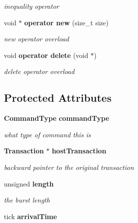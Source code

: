 \begin{CompactItemize}
\begin{CompactItemize}
\begin{CompactList}\small\item\em inequality operator \item\end{CompactList}\item 
void $\ast$ {\bf operator new} (size\_\-t size)\label{class_d_r_a_msim_i_i_1_1_command_e25604cfa43deb71cd91770ca9a83503}

\begin{CompactList}\small\item\em new operator overload \item\end{CompactList}\item 
void {\bf operator delete} (void $\ast$)\label{class_d_r_a_msim_i_i_1_1_command_d4a5dbe9c559e026cda58119042946b7}

\begin{CompactList}\small\item\em delete operator overload \item\end{CompactList}\end{CompactItemize}
\subsection*{Protected Attributes}
\begin{CompactItemize}
\item 
{\bf CommandType} {\bf commandType}\label{class_d_r_a_msim_i_i_1_1_command_d9c96c151b429f1a6ae4f4f1f0bb6976}

\begin{CompactList}\small\item\em what type of command this is \item\end{CompactList}\item 
{\bf Transaction} $\ast$ {\bf hostTransaction}\label{class_d_r_a_msim_i_i_1_1_command_97b111d32b69123034865baeceef2755}

\begin{CompactList}\small\item\em backward pointer to the original transaction \item\end{CompactList}\item 
unsigned {\bf length}\label{class_d_r_a_msim_i_i_1_1_command_c1361b967fa7530dd8d3ef02dca9b30f}

\begin{CompactList}\small\item\em the burst length \item\end{CompactList}\item 
tick {\bf arrivalTime}\label{class_d_r_a_msim_i_i_1_1_event_5eae270c205a02b2fb28d11ab84a6ed9}


\end{CompactItemize}
\end{CompactItemize}
